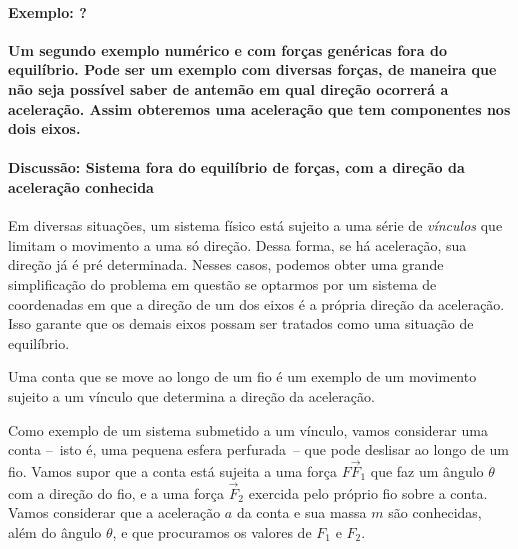 \paragraph{Exemplo: ?}

\textbf{Um segundo exemplo numérico e com forças genéricas fora do equilíbrio. Pode ser um exemplo com diversas forças, de maneira que não seja possível saber de antemão em qual direção ocorrerá a aceleração. Assim obteremos uma aceleração que tem componentes nos dois eixos.}

\paragraph{Discussão: Sistema fora do equilíbrio de forças, com a direção da aceleração conhecida}

Em diversas situações, um sistema físico está sujeito a uma série de \emph{vínculos} que limitam o movimento a uma só direção. Dessa forma, se há aceleração, sua direção já é pré determinada. Nesses casos, podemos obter uma grande simplificação do problema em questão se optarmos por um sistema de coordenadas em que a direção de um dos eixos é a própria direção da aceleração. Isso garante que os demais eixos possam ser tratados como uma situação de equilíbrio.

\begin{marginfigure}
\centering
{}
\caption{Uma conta que se move ao longo de um fio é um exemplo de um movimento sujeito a um vínculo que determina a direção da aceleração.\label{Fig:ContaDeslisandoEmFio}}
\end{marginfigure}

Como exemplo de um sistema submetido a um vínculo, vamos considerar uma conta --~isto é, uma pequena esfera perfurada~-- que pode deslisar ao longo de um fio. Vamos supor que a conta está sujeita a uma força $F\vec{F}_1$ que faz um ângulo $\theta$ com a direção do fio, e a uma força $\vec{F}_2$ exercida pelo próprio fio sobre a conta. Vamos considerar que a aceleração $a$ da conta e sua massa $m$ são conhecidas, além do ângulo $\theta$, e que procuramos os valores de $F_1$ e $F_2$.

